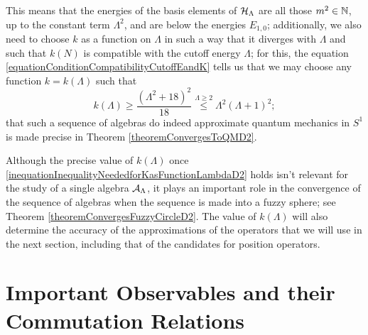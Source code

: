 This means that the energies of the basis elements of $\mathcal H_\Lambda$ are all those $m^2 \in \mathbb{N}$, up to the constant term $\Lambda^2$, and are below the energies $E_{1,0}$; additionally, we also need to choose $k$ as a function on $\Lambda$ in such a way that it diverges with $\Lambda$ and such that $k(N)$ is compatible with the cutoff energy $\Lambda$; for this, the equation \eqref{equationConditionCompatibilityCutoffEandK} tells us that we may choose any function $k = k(\Lambda)$ such that
\begin{equation}\label{inequationInequalityNeededforKasFunctionLambdaD2}
    k(\Lambda) \geq  \frac{\left( {\Lambda^2+18}\right)^2}{18}\overset{\Lambda \geq 2}{\leq} \Lambda^2 (\Lambda + 1)^2;
\end{equation}
that such a sequence of algebras do indeed approximate quantum mechanics in $S^1$ is made precise in Theorem \ref{theoremConvergesToQMD2}. 

Although the precise value of $k(\Lambda)$ once \eqref{inequationInequalityNeededforKasFunctionLambdaD2} holds isn't relevant for the study of a single algebra $\mathcal A_\Lambda$, it plays an important role in the convergence of the sequence of algebras when the sequence is made into a fuzzy sphere; see Theorem \ref{theoremConvergesFuzzyCircleD2}. The value of $k(\Lambda)$ will also determine the accuracy of the approximations of the operators that we will use in the next section, including that of the candidates for position operators.%


\section{Important Observables and their Commutation Relations}
\label{chNewFuzzySectionObservables}

    
